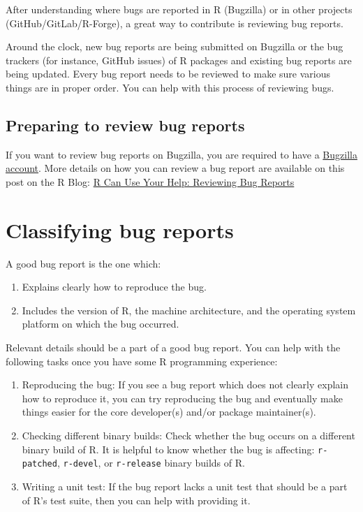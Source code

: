 \documentclass[
]{book}
\begin{document}
After understanding where bugs are reported in R (Bugzilla) or in other projects (GitHub/GitLab/R-Forge), a great way to contribute is reviewing bug reports.

Around the clock, new bug reports are being submitted on Bugzilla or the bug trackers (for instance, GitHub issues) of R packages and existing bug reports are being updated. Every bug report needs to be reviewed to make sure various things are in proper order. You can help with this process of reviewing bugs.

\subsection{Preparing to review bug reports}\label{preparing-to-review-bug-reports}

If you want to review bug reports on Bugzilla, you are required to have a \hyperref[bugzilla-account]{Bugzilla account}. More details on how you can review a bug report are available on this post on the R Blog: \href{https://blog.r-project.org/2019/10/09/r-can-use-your-help-reviewing-bug-reports/index.html}{R Can Use Your Help: Reviewing Bug Reports}

\section{Classifying bug reports}\label{classifying-bug-reports}

A good bug report is the one which:

\begin{enumerate}
\def\labelenumi{\arabic{enumi}.}
\item
  Explains clearly how to reproduce the bug.
\item
  Includes the version of R, the machine architecture, and the operating system platform on which the bug occurred.
\end{enumerate}

Relevant details should be a part of a good bug report. You can help with the following tasks once you have some R programming experience:

\begin{enumerate}
\def\labelenumi{\arabic{enumi}.}
\item
  Reproducing the bug: If you see a bug report which does not clearly explain how to reproduce it, you can try reproducing the bug and eventually make things easier for the core developer(s) and/or package maintainer(s).
\item
  Checking different binary builds: Check whether the bug occurs on a different binary build of R. It is helpful to know whether the bug is affecting: \texttt{r-patched}, \texttt{r-devel}, or \texttt{r-release} binary builds of R.
\item
  Writing a unit test: If the bug report lacks a unit test that should be a part of R's test suite, then you can help with providing it.
\end{enumerate}
\end{document}

